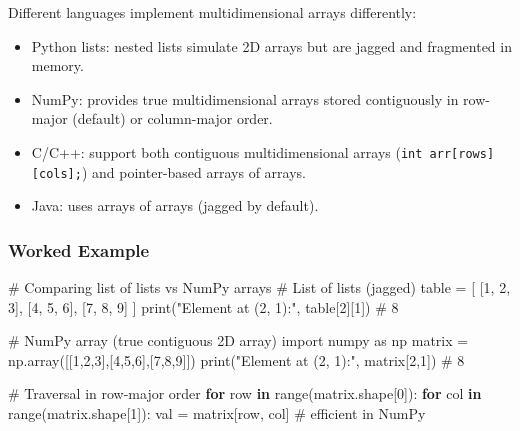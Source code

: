 \documentclass[
  letterpaper,
  DIV=11,
  numbers=noendperiod]{scrreprt}
\newenvironment{Shaded}{\begin{snugshade}}{\end{snugshade}}
\newcommand{\BuiltInTok}[1]{\textcolor[rgb]{0.00,0.23,0.31}{#1}}
\newcommand{\CommentTok}[1]{\textcolor[rgb]{0.37,0.37,0.37}{#1}}
\newcommand{\ControlFlowTok}[1]{\textcolor[rgb]{0.00,0.23,0.31}{\textbf{#1}}}
\newcommand{\DecValTok}[1]{\textcolor[rgb]{0.68,0.00,0.00}{#1}}
\newcommand{\ImportTok}[1]{\textcolor[rgb]{0.00,0.46,0.62}{#1}}
\newcommand{\KeywordTok}[1]{\textcolor[rgb]{0.00,0.23,0.31}{\textbf{#1}}}
\newcommand{\NormalTok}[1]{\textcolor[rgb]{0.00,0.23,0.31}{#1}}
\newcommand{\OperatorTok}[1]{\textcolor[rgb]{0.37,0.37,0.37}{#1}}
\newcommand{\StringTok}[1]{\textcolor[rgb]{0.13,0.47,0.30}{#1}}
\providecommand{\tightlist}{%
  \setlength{\itemsep}{0pt}\setlength{\parskip}{0pt}}
\begin{document}
Different languages implement multidimensional arrays differently:

\begin{itemize}
\tightlist
\item
  Python lists: nested lists simulate 2D arrays but are jagged and
  fragmented in memory.
\item
  NumPy: provides true multidimensional arrays stored contiguously in
  row-major (default) or column-major order.
\item
  C/C++: support both contiguous multidimensional arrays
  (\texttt{int\ arr{[}rows{]}{[}cols{]};}) and pointer-based arrays of
  arrays.
\item
  Java: uses arrays of arrays (jagged by default).
\end{itemize}

\subsubsection{Worked Example}\label{worked-example-7}

\begin{Shaded}
\begin{Highlighting}[]
\CommentTok{\# Comparing list of lists vs NumPy arrays}
\CommentTok{\# List of lists (jagged)}
\NormalTok{table }\OperatorTok{=}\NormalTok{ [}
\NormalTok{    [}\DecValTok{1}\NormalTok{, }\DecValTok{2}\NormalTok{, }\DecValTok{3}\NormalTok{],}
\NormalTok{    [}\DecValTok{4}\NormalTok{, }\DecValTok{5}\NormalTok{, }\DecValTok{6}\NormalTok{],}
\NormalTok{    [}\DecValTok{7}\NormalTok{, }\DecValTok{8}\NormalTok{, }\DecValTok{9}\NormalTok{]}
\NormalTok{]}
\BuiltInTok{print}\NormalTok{(}\StringTok{"Element at (2, 1):"}\NormalTok{, table[}\DecValTok{2}\NormalTok{][}\DecValTok{1}\NormalTok{])  }\CommentTok{\# 8}

\CommentTok{\# NumPy array (true contiguous 2D array)}
\ImportTok{import}\NormalTok{ numpy }\ImportTok{as}\NormalTok{ np}
\NormalTok{matrix }\OperatorTok{=}\NormalTok{ np.array([[}\DecValTok{1}\NormalTok{,}\DecValTok{2}\NormalTok{,}\DecValTok{3}\NormalTok{],[}\DecValTok{4}\NormalTok{,}\DecValTok{5}\NormalTok{,}\DecValTok{6}\NormalTok{],[}\DecValTok{7}\NormalTok{,}\DecValTok{8}\NormalTok{,}\DecValTok{9}\NormalTok{]])}
\BuiltInTok{print}\NormalTok{(}\StringTok{"Element at (2, 1):"}\NormalTok{, matrix[}\DecValTok{2}\NormalTok{,}\DecValTok{1}\NormalTok{])  }\CommentTok{\# 8}

\CommentTok{\# Traversal in row{-}major order}
\ControlFlowTok{for}\NormalTok{ row }\KeywordTok{in} \BuiltInTok{range}\NormalTok{(matrix.shape[}\DecValTok{0}\NormalTok{]):}
    \ControlFlowTok{for}\NormalTok{ col }\KeywordTok{in} \BuiltInTok{range}\NormalTok{(matrix.shape[}\DecValTok{1}\NormalTok{]):}
\NormalTok{        val }\OperatorTok{=}\NormalTok{ matrix[row, col]  }\CommentTok{\# efficient in NumPy}
\end{Highlighting}
\end{Shaded}
\end{document}
